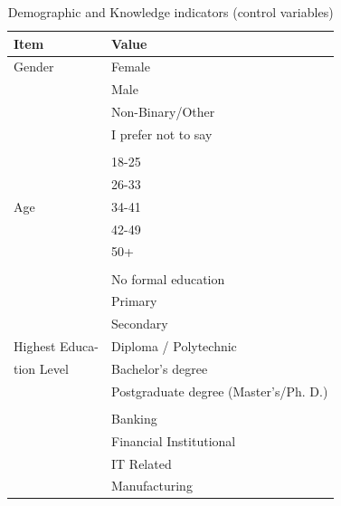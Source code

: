 \documentclass[twocolumn]{article}
\begin{document}
\begin{table}[H]
\centering
\small
\caption{Demographic and Knowledge indicators (control variables)}
\label{tab:demographics}
\begin{tabular}{p{2.5cm}p{5cm}}
\hline
\textbf{Item}                                         & \textbf{Value} \\ \hline
Gender                                                & Female \\
                                                      & Male \\
                                                      & Non-Binary/Other \\
                                                      & I prefer not to say \\
\\                                                    & 18-25 \\
                                                      & 26-33 \\
Age                                                   & 34-41 \\
                                                      & 42-49 \\
                                                      & 50+ \\
\\                                                    & No formal education \\
                                                      & Primary \\
                                                      & Secondary \\
Highest Educa-                                        & Diploma / Polytechnic \\
tion Level                                            & Bachelor's degree \\
                                                      & Postgraduate degree (Master's/Ph. D.) \\
\\                                                    & Banking \\
                                                      & Financial Institutional \\
                                                      & IT Related \\
                                                      & Manufacturing \\

\end{tabular}
\end{table}
\end{document}
